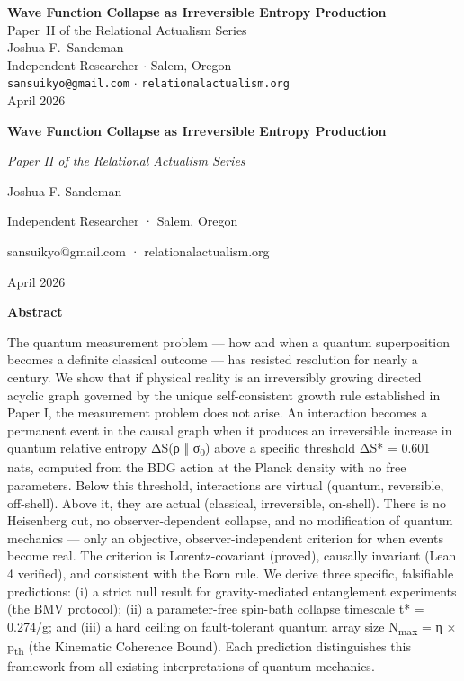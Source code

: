 \documentclass[12pt,a4paper]{article}
\begin{document}
\begin{center}
{\LARGE\bfseries Wave Function Collapse as Irreversible Entropy Production}\\[18pt]
{\large Paper~II of the Relational Actualism Series}\\[12pt]
{\large Joshua F.\ Sandeman}\\[4pt]
{\small Independent Researcher $\cdot$ Salem, Oregon}\\
{\small\texttt{sansuikyo@gmail.com} $\cdot$ \texttt{relationalactualism.org}}\\[6pt]
{\small April 2026}
\end{center}
\vspace{1em}

\textbf{Wave Function Collapse as Irreversible Entropy Production}

\emph{Paper II of the Relational Actualism Series}

Joshua F. Sandeman

Independent Researcher · Salem, Oregon

sansuikyo@gmail.com · relationalactualism.org

April 2026

\textbf{Abstract}

The quantum measurement problem --- how and when a quantum superposition
becomes a definite classical outcome --- has resisted resolution for
nearly a century. We show that if physical reality is an irreversibly
growing directed acyclic graph governed by the unique self-consistent
growth rule established in Paper I, the measurement problem does not
arise. An interaction becomes a permanent event in the causal graph when
it produces an irreversible increase in quantum relative entropy ΔS(ρ ‖
σ\textsubscript{0}) above a specific threshold ΔS* = 0.601 nats,
computed from the BDG action at the Planck density with no free
parameters. Below this threshold, interactions are virtual (quantum,
reversible, off-shell). Above it, they are actual (classical,
irreversible, on-shell). There is no Heisenberg cut, no
observer-dependent collapse, and no modification of quantum mechanics
--- only an objective, observer-independent criterion for when events
become real. The criterion is Lorentz-covariant (proved), causally
invariant (Lean 4 verified), and consistent with the Born rule. We
derive three specific, falsifiable predictions: (i) a strict null result
for gravity-mediated entanglement experiments (the BMV protocol); (ii) a
parameter-free spin-bath collapse timescale t* = 0.274/g; and (iii) a
hard ceiling on fault-tolerant quantum array size N\textsubscript{max} =
η × p\textsubscript{th} (the Kinematic Coherence Bound). Each prediction
distinguishes this framework from all existing interpretations of
quantum mechanics.
\end{document}
